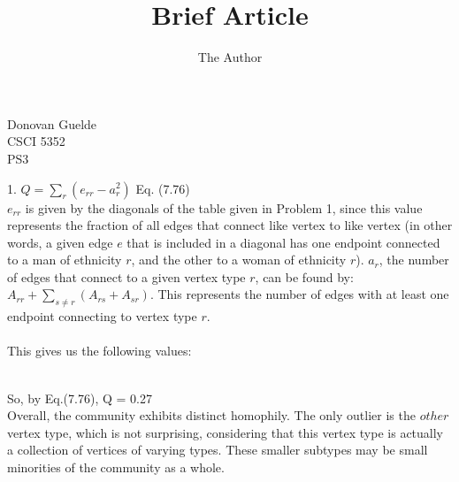 \documentclass[11pt, oneside]{article}   	%
\title{Brief Article}
\author{The Author}
\begin{document}
\begin{flushright}
Donovan Guelde\\
CSCI 5352\\
PS3\\
\end{flushright}
1. $Q = \sum_r (e_{rr} -a_r^2)$ Eq. (7.76)\\
\indent $e_{rr}$ is given by the diagonals of the table given in Problem 1, since this value represents the fraction of all edges that connect like vertex to like vertex (in other words, a given edge $e$ that is included in a diagonal has one endpoint connected to a man of ethnicity $r$, and the other to a woman of ethnicity $r$).  $a_r$, the number of edges that connect to a given vertex type $r$, can be found by: $A_{rr} +\sum_{s \ne r} (A_{rs} + A_{sr})$.  This represents the number of edges with at least one endpoint connecting to vertex type $r$.\\\\
\indent This gives us the following values:
 \\
 So, by Eq.(7.76), Q = 0.27\\
 \indent Overall, the community exhibits distinct homophily.  The only outlier is the $other$ vertex type, which is not surprising, considering that this vertex type is actually a collection of vertices of varying types.  These smaller subtypes may be small minorities of the community as a whole.\\
 \\
\end{document}
